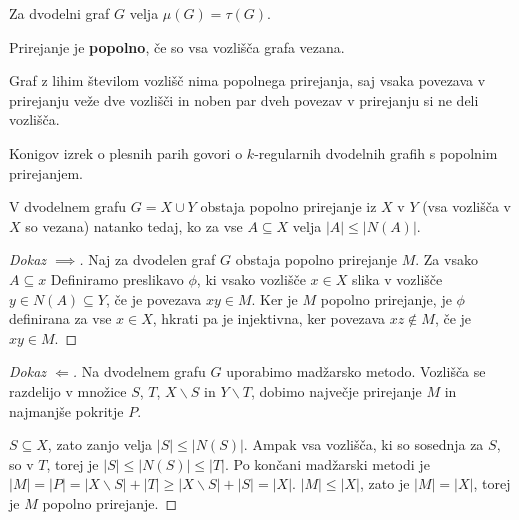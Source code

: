 \documentclass[11pt, a4paper]{article}
\begin{document}
    \begin{remark}
        Za dvodelni graf \(G\) velja \(\mu(G)=\tau(G)\).
    \end{remark}

    \begin{definition}
        Prirejanje je \textbf{popolno}, če so vsa vozlišča grafa vezana.
    \end{definition}

    Graf z lihim številom vozlišč nima popolnega prirejanja, saj vsaka povezava v prirejanju veže dve vozlišči in noben par dveh povezav v prirejanju si ne deli vozlišča.

    \begin{remark}
        Konigov izrek o plesnih parih govori o \(k\)-regularnih dvodelnih grafih s popolnim prirejanjem.
    \end{remark}

    \begin{theorem}
        V dvodelnem grafu \(G=X \cup Y\) obstaja popolno prirejanje iz \(X\) v \(Y\) (vsa vozlišča v \(X\) so vezana) natanko tedaj, ko za vse \(A \subseteq X\) velja \(|A| \le |N(A)|\).
    \end{theorem}

    \begin{proof}[Dokaz \(\implies\)]
        Naj za dvodelen graf \(G\) obstaja popolno prirejanje \(M\). Za vsako \(A \subseteq x\) Definiramo preslikavo \(\phi\), ki vsako vozlišče \(x \in X\) slika v vozlišče \(y \in N(A) \subseteq Y\), če je povezava \(xy \in M\). Ker je \(M\) popolno prirejanje, je \(\phi\) definirana za vse \(x \in X\), hkrati pa je injektivna, ker povezava \(xz \notin M\), če je \(xy \in M\).
    \end{proof}

    \begin{proof}[Dokaz \(\Longleftarrow\)]
        Na dvodelnem grafu \(G\) uporabimo madžarsko metodo. Vozlišča se razdelijo v množice \(S\), \(T\), \(X \backslash S\) in \(Y \backslash T\), dobimo največje prirejanje \(M\) in najmanjše pokritje \(P\).
        \par
        \(S \subseteq X\), zato zanjo velja \(|S| \le |N(S)|\). Ampak vsa vozlišča, ki so sosednja za \(S\), so v \(T\), torej je \(|S| \le |N(S)| \le |T|\). Po končani madžarski metodi je \(|M|=|P|=|X \backslash S| + |T| \ge |X \backslash S| + |S| = |X|\). \(|M| \le |X|\), zato je \(|M| = |X|\), torej je \(M\) popolno prirejanje.
    \end{proof}
\end{document}
